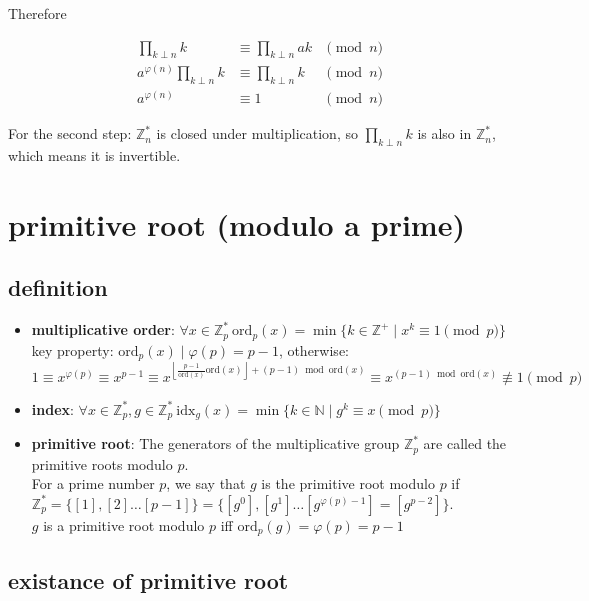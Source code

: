 \documentclass{article}
\newcommand{\NN}{\mathbb{N}}
\newcommand{\ZZ}{\mathbb{Z}}
\newcommand{\floor}[1]{\left\lfloor{#1}\right\rfloor}
\newcommand{\ord}{\mathrm{ord}}
\newcommand{\idx}{\mathrm{idx}}
\begin{document}
Therefore

\[
	\begin{aligned}
		\prod_{k\perp n} k                & \equiv \prod_{k\perp n} ak & \pmod n \\
		a^{\varphi(n)} \prod_{k\perp n} k & \equiv \prod_{k\perp n} k  & \pmod n \\
		a^{\varphi(n)}                    & \equiv 1                   & \pmod n
	\end{aligned}
\]

For the second step: $\ZZ_n^\ast$ is closed under multiplication,
so $\prod_{k\perp n} k$ is also in $\ZZ_n^\ast$, which means it is invertible.


\newpage
\section{primitive root (modulo a prime)}

\subsection{definition}

\begin{itemize}
	\item \textbf{multiplicative order}:
	      $\forall x\in \ZZ_p^\ast\ \ord_p(x)=\min\{k\in \ZZ^+\mid x^k\equiv 1\pmod p\}$\\
				key property: $\ord_p(x) \mid \varphi(p)=p-1$, otherwise:
				\[
					1
					\equiv x^{\varphi(p)}
					\equiv x^{p-1}
					\equiv x^{\floor{\frac{p-1}{\ord(x)}\ord(x)}+(p-1)\bmod \ord(x)}
					\equiv x^{(p-1)\bmod \ord(x)}
					\not\equiv 1
					\pmod p
				\]
	\item \textbf{index}:
		$\forall x\in \ZZ_p^\ast,g\in \ZZ_p^\ast\ \idx_g(x)=\min\{k\in \NN\mid g^k\equiv x\pmod p\}$
	\item \textbf{primitive root}:
	      The generators of the multiplicative group $\ZZ_p^\ast$ are called the primitive roots modulo $p$.\\
	      For a prime number $p$, we say that $g$ is the primitive root modulo $p$ if $\ZZ_p^\ast = \{[1],[2]\ldots [p-1]\}=\{[g^0],[g^1]\ldots [g^{\varphi(p)-1}]=[g^{p-2}]\}$.\\
				$g$ is a primitive root modulo $p$ iff $\ord_p(g)=\varphi(p)=p-1$
\end{itemize}

\subsection{existance of primitive root}
\end{document}
